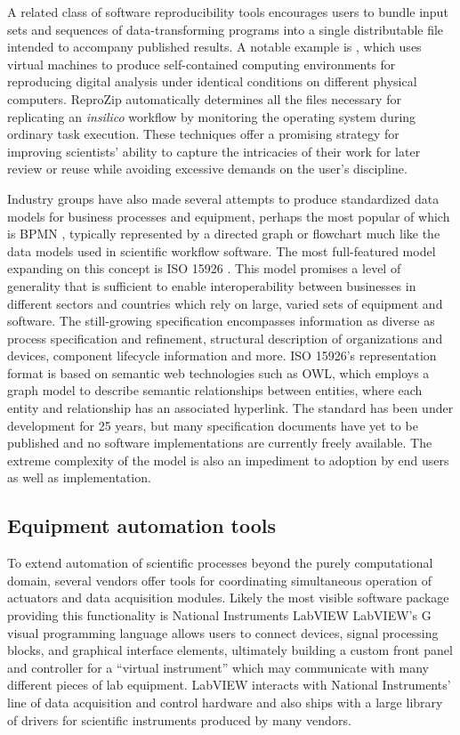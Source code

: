 \documentclass[../thesis]{subfiles}
\begin{document}
A related class of software reproducibility tools encourages users to
bundle input sets and sequences of data-transforming programs into a
single distributable file intended to accompany published results.
A notable example is \cite{ReproZip}, which uses virtual machines to
produce self-contained computing environments for reproducing digital
analysis under identical conditions on different physical
computers. ReproZip automatically determines all the files necessary
for replicating an \textit{\gls{insilico}} workflow by monitoring the operating
system during ordinary task execution. These techniques offer a
promising strategy for improving scientists' ability to capture the
intricacies of their work for later review or reuse while avoiding
excessive demands on the user's discipline.

Industry groups have also made several attempts to produce
standardized data models for business processes and equipment, perhaps
the most popular of which is \gls{BPMN}
\cite{Allweyer:2010:BPM:1841147}, typically represented by a directed
graph or flowchart much like the data models used in scientific
workflow software. The
most full-featured model expanding on this concept is ISO 15926
\cite{West2009}. This model promises
a level of generality that is sufficient to enable interoperability
between businesses in different sectors and countries which rely on
large, varied sets of equipment and software. The still-growing
specification encompasses information as diverse as process
specification and refinement, structural description of organizations
and devices, component lifecycle information and more. ISO 15926's
representation format is based on semantic web technologies such as OWL, which
employs a graph model to describe semantic relationships between
entities, where each entity and relationship has an associated
hyperlink. The standard has been under development for 25 years, but
many specification documents have yet to be published and no software
implementations are currently freely available. The extreme complexity
of the model is also an impediment to adoption by end users as well as
implementation.



\subsection{Equipment automation tools}

To extend automation of scientific processes beyond the purely
computational domain, several vendors offer tools for coordinating
simultaneous operation of actuators and data acquisition modules.
Likely the most visible software package providing this functionality
is National Instruments LabVIEW \cite{ELLIOTT2007}
LabVIEW's G visual programming language allows users to connect
devices, signal processing blocks, and graphical interface elements,
ultimately building a custom front panel and controller for a
``virtual instrument'' which may communicate with many different
pieces of lab equipment. LabVIEW interacts with National Instruments'
line of data acquisition and control hardware and also ships with a
large library of drivers for scientific instruments produced by many
vendors.
\end{document}
